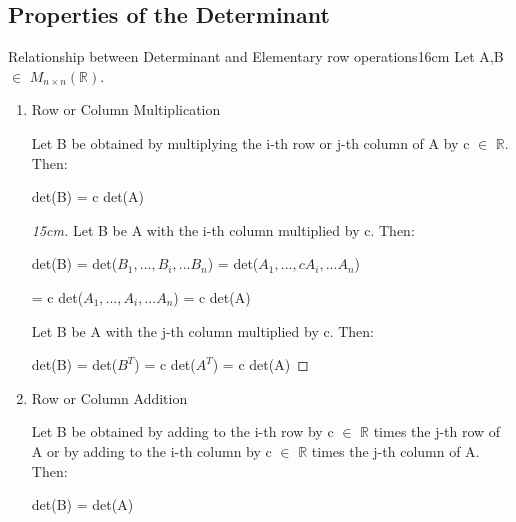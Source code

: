 \subsection{ Properties of the Determinant }

    \begin{wtheorem}{Relationship between Determinant and Elementary
    row operations}{16cm}
        Let A,B $\in$ $M_{n \times n}(\mathbb{R})$.
    \end{wtheorem}

    \begin{enumerate}[label=(\alph*), leftmargin=2cm, itemsep=0.1cm]
        \item {\color{lgreen} Row or Column Multiplication}

            Let B be obtained by multiplying the i-th row or j-th column
            of A by c $\in$ $\mathbb{R}$. Then:

            \hspace{0.5cm}
            det(B) = c det(A)

            \begin{proof}[15cm]
                Let B be A with the i-th column multiplied by c. Then:
                
                \hspace{0.5cm}
                det(B)
                = det($B_1,...,B_i,...B_n$)
                = det($A_1,...,cA_i,...A_n$)

                \hspace{1.8cm}
                = c det($A_1,...,A_i,...A_n$)
                = c det(A)

                Let B be A with the j-th column multiplied by c. Then:

                \hspace{0.5cm}
                det(B)
                = det($B^T$)
                = c det($A^T$)
                = c det(A)
            \end{proof}

        \item {\color{lgreen} Row or Column Addition}
        
            Let B be obtained by adding to the i-th row by c $\in$ $\mathbb{R}$
            times the j-th row of A or by adding to the i-th column by
            c $\in$ $\mathbb{R}$ times the j-th column of A. Then:

            \hspace{0.5cm}
            det(B) = det(A)
            

\end{enumerate}
